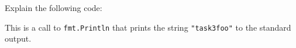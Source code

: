Explain the following code:

\lstset{rangeprefix=/**,
        rangesuffix=**/}



\begin{solution}
    This is a call to \lstinline{fmt.Println}
    that prints the string \lstinline{"task3foo"} to the standard output.
\end{solution}
